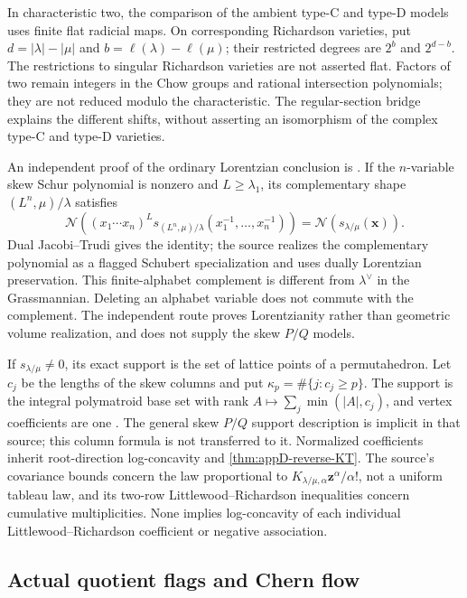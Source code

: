 In characteristic two, the comparison of the ambient type-C and
type-D models uses finite flat radicial maps. On corresponding
Richardson varieties, put $d=|\lambda|-|\mu|$ and
$b=\ell(\lambda)-\ell(\mu)$; their restricted degrees are
$2^b$ and $2^{d-b}$. The restrictions to singular Richardson
varieties are not asserted flat. Factors of two remain integers
in the Chow groups and rational intersection polynomials;
they are not reduced modulo the characteristic. The regular-section
bridge explains the different shifts, without asserting an
isomorphism of the complex type-C and type-D varieties.

An independent proof of the ordinary Lorentzian conclusion is
\cite{Zhang26SkewSchurV1}. If the $n$-variable skew Schur
polynomial is nonzero and $L\geq\lambda_1$, its complementary
shape $(L^n,\mu)/\lambda$ satisfies
\[
 \mathcal N\left((x_1\cdots x_n)^L
       s_{(L^n,\mu)/\lambda}(x_1^{-1},\ldots,x_n^{-1})\right)
       =\mathcal N(s_{\lambda/\mu}(\mathbf x)).
\tag{F.30}\label{eq:appF-skew-Schur-finite-dual}
\]
Dual Jacobi--Trudi gives the identity; the source realizes the
complementary polynomial as a flagged Schubert specialization
and uses dually Lorentzian preservation. This finite-alphabet
complement is different from $\lambda^\vee$ in the Grassmannian.
Deleting an alphabet variable does not commute with the complement.
The independent route proves Lorentzianity rather than geometric
volume realization, and does not supply the skew $P/Q$ models.

If $s_{\lambda/\mu}\ne0$, its exact support is the set of
lattice points of a permutahedron. Let $c_j$ be the lengths of
the skew columns and put $\kappa_p=\#\{j:c_j\geq p\}$.
The support is the integral polymatroid base set with rank
$A\mapsto\sum_j\min(|A|,c_j)$, and vertex coefficients are
one \cite[\S7]{NguyenDang26RichardsonV2}.
The general skew $P/Q$ support description is implicit in that
source; this column formula is not transferred to it.
Normalized coefficients inherit root-direction log-concavity and
\cref{thm:appD-reverse-KT}. The source's covariance bounds concern
the law proportional to $K_{\lambda/\mu,\alpha}\mathbf z^\alpha/\alpha!$,
not a uniform tableau law, and its two-row Littlewood--Richardson
inequalities concern cumulative multiplicities. None implies
log-concavity of each individual Littlewood--Richardson coefficient
or negative association.

\subsection{Actual quotient flags and Chern flow}
\label{sec:appF-Chern-flow}

